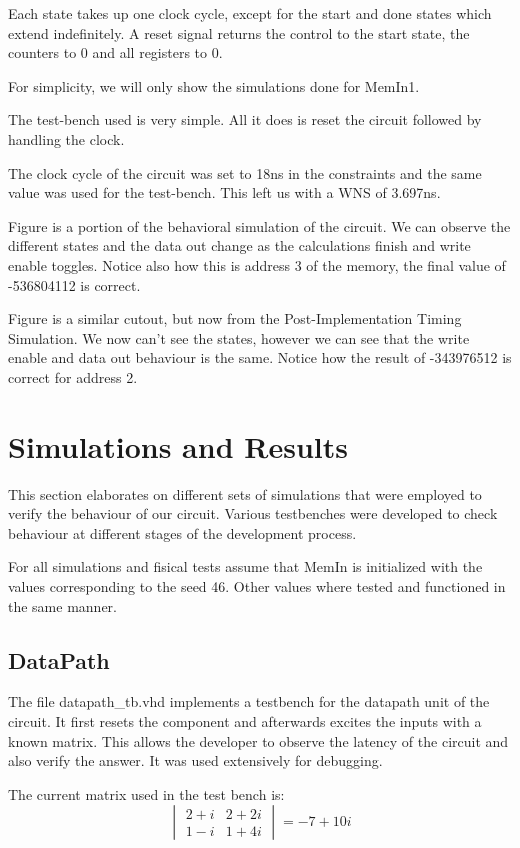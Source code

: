 \documentclass[12pt]{article}
\begin{document}
Each state takes up one clock cycle, except for the start and done states which extend indefinitely. A reset signal returns the control to the start state, the counters to 0 and all registers to 0.


For simplicity, we will only show the simulations done for MemIn1.

The test-bench used is very simple. All it does is reset the circuit followed by handling the clock.

The clock cycle of the circuit was set to 18ns in the constraints and the same value was used for the test-bench. This left us with a WNS of 3.697ns.


Figure is a portion of the behavioral simulation of the circuit. We can observe the different states and the data out change as the calculations finish and write enable toggles. Notice also how this is address 3 of the memory, the final value of -536804112 is correct.


Figure is a similar cutout, but now from the Post-Implementation Timing Simulation. We now can't see the states, however we can see that the write enable and data out behaviour is the same. Notice how the result of -343976512 is correct for address 2.

\section{Simulations and Results}
This section elaborates on different sets of simulations that were employed to verify the behaviour of our circuit. Various testbenches were developed to check behaviour at different stages of the development process.

For all simulations and fisical tests assume that MemIn is initialized with the values corresponding to the seed 46. Other values where tested and functioned in the same manner.
\subsection{DataPath}
The file datapath\_tb.vhd implements a testbench for the datapath unit of the circuit. 
It first resets the component and afterwards excites the inputs with a known matrix. This allows the developer to observe the latency of the circuit and also verify the answer. It was used extensively for debugging. 

The current matrix used in the test bench is:
\begin{equation*}
	\begin{vmatrix} 2+i & 2+2i \\ 
					1-i & 1+4i 
	\end{vmatrix} 
	= -7 + 10i
\end{equation*}
\end{document}
